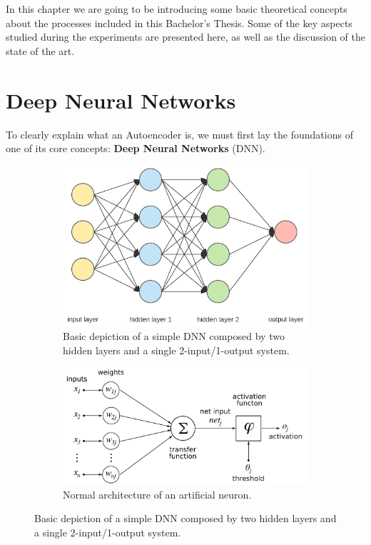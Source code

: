 
In this chapter we are going to be introducing some basic theoretical concepts about the processes included in this Bachelor's Thesis. Some of the key aspects studied during the experiments are presented here, as well as the discussion of the state of the art.

\section{Deep Neural Networks}

To clearly explain what an Autoencoder is, we must first lay the foundations of one of its core concepts: \textbf{Deep Neural Networks} (DNN).\par
%
\begin{figure}[H]
	\begin{subfigure}{0.65\linewidth}  
		\centering
		\includegraphics[width=\linewidth]{Figuras_tfg/Figure2_tfg}
		\caption{Basic depiction of a simple DNN composed by two hidden layers and a single 2-input/1-output system.}
		\label{fig:fig2a} 
	\end{subfigure}
	
	\begin{subfigure}{0.65\linewidth} 
		\centering
		\includegraphics[width=\linewidth]{Figuras_tfg/ArtificialNeuronModel_english.png}
		\caption{Normal architecture of an artificial neuron.}
		\label{fig:fig2b} 
	\end{subfigure}
	\caption{Basic depiction of a simple DNN composed by two hidden layers and a single 2-input/1-output system.}
	\label{fig:fig2}
\end{figure}

